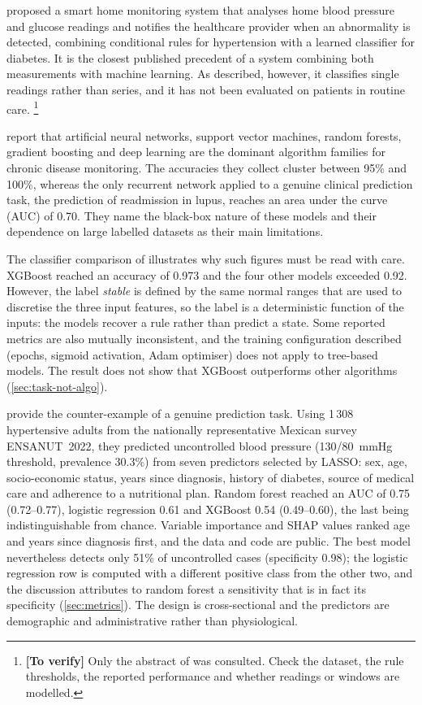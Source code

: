 \documentclass[12pt,a4paper,oneside]{report}
\newcommand{\verify}[1]{\footnote{\textbf{[To verify]} #1}}
\begin{document}
\Textcite{chatrati2022} proposed a smart home monitoring system that analyses home blood pressure and glucose readings and notifies the healthcare provider when an abnormality is detected, combining conditional rules for hypertension with a learned classifier for diabetes. It is the closest published precedent of a system combining both measurements with machine learning. As described, however, it classifies single readings rather than series, and it has not been evaluated on patients in routine care.%
\verify{Only the abstract of \textcite{chatrati2022} was consulted. Check the dataset, the rule thresholds, the reported performance and whether readings or windows are modelled.}

\Textcite{liu2025review} report that artificial neural networks, support vector machines, random forests, gradient boosting and deep learning are the dominant algorithm families for chronic disease monitoring. The accuracies they collect cluster between 95\% and 100\%, whereas the only recurrent network applied to a genuine clinical prediction task, the prediction of readmission in lupus, reaches an area under the curve (AUC) of 0.70. They name the black-box nature of these models and their dependence on large labelled datasets as their main limitations.

The classifier comparison of \textcite{efendi2025} illustrates why such figures must be read with care. XGBoost reached an accuracy of 0.973 and the four other models exceeded 0.92. However, the label \emph{stable} is defined by the same normal ranges that are used to discretise the three input features, so the label is a deterministic function of the inputs: the models recover a rule rather than predict a state. Some reported metrics are also mutually inconsistent, and the training configuration described (epochs, sigmoid activation, Adam optimiser) does not apply to tree-based models. The result does not show that XGBoost outperforms other algorithms (\cref{sec:task-not-algo}).

\Textcite{mendoza2025} provide the counter-example of a genuine prediction task. Using 1\,308 hypertensive adults from the nationally representative Mexican survey ENSANUT~2022, they predicted uncontrolled blood pressure (130/80~mmHg threshold, prevalence 30.3\%) from seven predictors selected by LASSO: sex, age, socio-economic status, years since diagnosis, history of diabetes, source of medical care and adherence to a nutritional plan. Random forest reached an AUC of 0.75 (0.72--0.77), logistic regression 0.61 and XGBoost 0.54 (0.49--0.60), the last being indistinguishable from chance. Variable importance and SHAP values ranked age and years since diagnosis first, and the data and code are public. The best model nevertheless detects only 51\% of uncontrolled cases (specificity 0.98); the logistic regression row is computed with a different positive class from the other two, and the discussion attributes to random forest a sensitivity that is in fact its specificity (\cref{sec:metrics}). The design is cross-sectional and the predictors are demographic and administrative rather than physiological.
\end{document}
